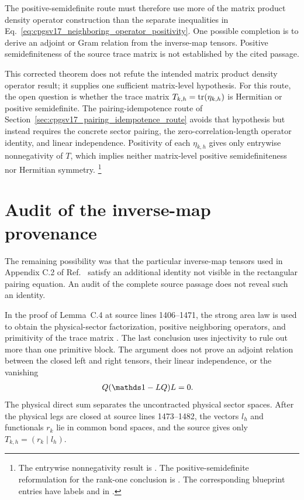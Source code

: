 \documentclass{article}
\begin{document}
The positive-semidefinite route must therefore use more of the matrix product
density operator construction than the separate inequalities in
Eq.~\ref{eq:cpgsv17_neighboring_operator_positivity}. One possible completion
is to derive an adjoint or Gram relation from the inverse-map tensors.
Positive semidefiniteness of the source trace matrix is not established by the
cited passage.

This corrected theorem does not refute the intended matrix product density
operator result; it supplies one sufficient matrix-level hypothesis. For this
route, the open question is whether the trace matrix
$T_{k,h}=\operatorname{tr}(\eta_{k,h})$ is Hermitian or positive semidefinite. The
pairing-idempotence route of
Section~\ref{sec:cpgsv17_pairing_idempotence_route} avoids that hypothesis but
instead requires the concrete sector pairing, the zero-correlation-length
operator identity, and linear independence. Positivity of each $\eta_{k,h}$
gives only entrywise nonnegativity of $T$, which implies neither matrix-level
positive semidefiniteness nor Hermitian symmetry.
\footnote{The entrywise nonnegativity result is
{\scriptsize{}}. The
positive-semidefinite reformulation for the rank-one conclusion is
{\scriptsize{}}. The
corresponding blueprint entries have labels
\texttt{} and
\texttt{} in
.}

\section{Audit of the inverse-map provenance}
\label{sec:cpgsv17_inverse_map_audit}

The remaining possibility was that the particular inverse-map tensors used in
Appendix C.2 of Ref.~\cite{Cirac2016MPDO_arXiv} satisfy an additional identity
not visible in the rectangular pairing equation. An audit of the complete
source passage does not reveal such an identity.

In the proof of Lemma~C.4 at source lines 1406--1471, the strong area law is
used to obtain the physical-sector factorization, positive neighboring
operators, and primitivity of the trace matrix
\cite[Appendix~C.2]{Cirac2016MPDO_arXiv}. The last conclusion uses injectivity
to rule out more than one primitive block. The argument does not prove an
adjoint relation between the closed left and right tensors, their linear
independence, or the vanishing
\begin{align}
    Q(\Id-LQ)L
        &= 0.
    \label{eq:cpgsv17_audit_required_vanishing}
\end{align}
The physical direct sum separates the uncontracted physical sector spaces.
After the physical legs are closed at source lines 1473--1482, the vectors
$l_h$ and functionals $r_k$ lie in common bond spaces, and the source gives
only $T_{k,h}=(r_k\mid l_h)$.
\end{document}
